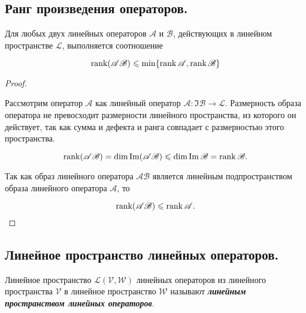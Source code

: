 \newpage


\subsection{
    Ранг произведения операторов.
}

Для любых двух линейных операторов $\mathscr{A}$ и $\mathscr{B}$, действующих в линейном пространстве $\mathcal{L}$, выполняется соотношение

$$\operatorname{\mathop{\mathrm{rank}}}(\mathscr{A}\mathscr{B}) \leqslant \min\{\operatorname{\mathop{\mathrm{rank}}}\mathscr{A}, \operatorname{\mathop{\mathrm{rank}}}\mathscr{B}\}$$

\begin{proof}~

    Рассмотрим оператор $\mathscr{A}$ как линейный оператор $\mathscr{A}\colon \Im\mathscr{B} \to \mathcal{L}$. Размерность образа оператора не превосходит размерности линейного пространства, из которого он действует, так как сумма и дефекта и ранга совпадает с размерностью этого пространства.

    $$\operatorname{\mathop{\mathrm{rank}}}(\mathscr{A}\mathscr{B}) = \dim \operatorname{\mathop{\mathrm{Im}}} (\mathscr{A}\mathscr{B}) \leqslant \dim \operatorname{\mathop{\mathrm{Im}}} \mathscr{B} = \operatorname{\mathop{\mathrm{rank}}} \mathscr{B}.$$
    
    Так как образ линейного оператора $\mathscr{A}\mathscr{B}$ является линейным подпространством образа линейного оператора $\mathscr{A}$, то
    
    $$\operatorname{\mathop{\mathrm{rank}}}(\mathscr{A}\mathscr{B}) \leqslant \operatorname{\mathop{\mathrm{rank}}} \mathscr{A}.$$
\end{proof}


\newpage


\subsection{
    Линейное пространство линейных операторов.
}

\begin{definition}
    Линейное пространство $\mathcal{L}(\mathcal{V}, \mathcal{W})$ линейных операторов из линейного пространства $\mathcal{V}$ в линейное пространство $\mathcal{W}$ называют \textbf{\textit{линейным пространством линейных операторов}}.
\end{definition}

